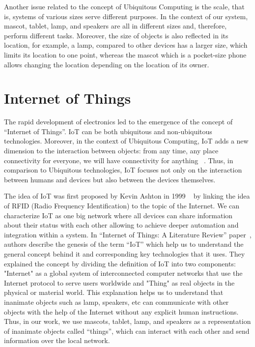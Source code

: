 Another issue related to the concept of Ubiquitous Computing is the scale,
that is, systems of various sizes serve different purposes.
In the context of our system, mascot, tablet, lamp, and speakers are all in
different sizes and, therefore, perform different tasks.
Moreover, the size of objects is also reflected in its location, for example, a lamp, compared
to other devices has a larger size, which limits its location to one point, whereas the mascot
which is a pocket-size phone allows changing the location depending on the location of its owner.

\section{Internet of Things}
\label{sec:Internet of Things}
The rapid development of electronics led to the emergence of the concept of “Internet of Things”.
IoT can be both ubiquitous and non-ubiquitous technologies.
Moreover, in the context of Ubiquitous
Computing, IoT adds a new dimension to the interaction between objects: from any time, any place
connectivity for everyone, we will have connectivity for anything ~\cite{tan2010future}.
Thus, in comparison to Ubiquitous technologies, IoT focuses not only on the interaction
between humans and devices but also between the devices themselves.

The idea of IoT was first proposed by Kevin Ashton in 1999 ~\cite{ashton2009internet}
by linking the idea of RFID (Radio Frequency Identification) to the topic of the Internet.
We can characterize IoT as one big network where all devices can share information about their status with
each other allowing to achieve deeper automation and integration within a system.
In “Internet of Things: A Literature Review” paper~\cite{madakam2015internet}, authors describe
the genesis of the term “IoT” which help us to understand the general concept behind it and
corresponding key technologies that it uses.
They explained the concept by dividing the definition of IoT into two components: "Internet"
as a global system of interconnected computer networks that use the Internet protocol to serve users worldwide
and "Thing" as real objects in the physical or material world.
This explanation helps us to understand that inanimate objects such as lamp, speakers,
etc can communicate with other objects with the help of the Internet without any explicit human instructions.
Thus, in our work, we use mascots, tablet, lamp, and speakers as a representation of inanimate
objects called “things”, which can interact with each other and send information over the local network.

